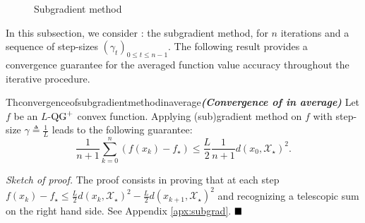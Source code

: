 \begin{wrapfigure}[5]{R}{0.4\textwidth}
\vspace{-1.8cm}
\begin{minipage}{0.4\textwidth}
\begin{algorithm}[H]
    \caption{Subgradient method}\label{alg:subgrad}
\end{algorithm}
\end{minipage}
\end{wrapfigure}
In this subsection, we consider : the subgradient method, for $n$ iterations and a sequence of step-sizes $(\gamma_{t})_{0\le t\le n-1 }$.
The following result provides a convergence guarantee for the averaged function value accuracy throughout the iterative procedure.
\begin{restatable}{Th}{convergenceofsubgradientmethodinaverage}\textbf{\emph{(Convergence of  in average)}}
    \label{thm:gd_average}
    Let $f$ be an $L$-$\operatorname{QG}^+$ convex function. Applying (sub)gradient method on $f$ with step-size $\gamma \triangleq \frac{1}{L}$ leads to the following guarantee:
    \begin{equation}
        \frac{1}{n+1}\sum_{k=0}^n (f(x_k) - f_\star) \leq \frac{L}{2}\frac{1}{n+1} d(x_0, \mathcal{X}_\star)^2.
    \end{equation}
\end{restatable}

\noindent \textit{Sketch of proof.}
    The proof consists in proving that at each step
    $
        f(x_k) - f_\star \leq \frac{L}{2}d(x_k, \mathcal{X}_\star)^2 - \frac{L}{2}d(x_{k+1}, \mathcal{X}_\star)^2
    $
    and recognizing a telescopic sum on the right hand side.
    See Appendix \ref{apx:subgrad}.%
$\hfill\blacksquare$

